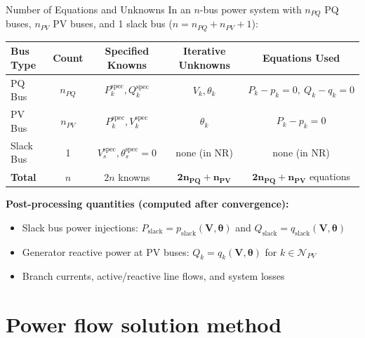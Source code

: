 \begin{frame}[allowframebreaks]{Number of Equations and Unknowns}
    In an $n$-bus power system with $n_{PQ}$ PQ buses, $n_{PV}$ PV buses, and 1 slack bus ($n = n_{PQ} + n_{PV} + 1$):
    
    \begin{table}[h]
        \centering
        \small
        \begin{tabular}{lcccc}
            \toprule
            \textbf{Bus Type} & \textbf{Count} & \textbf{Specified Knowns} & \textbf{Iterative Unknowns} & \textbf{Equations Used} \\
            \midrule
            PQ Bus    & $n_{PQ}$ & $P_k^{\text{spec}}, Q_k^{\text{spec}}$ & $V_k, \theta_k$ & $P_k - p_k = 0, \ Q_k - q_k = 0$ \\
            PV Bus    & $n_{PV}$ & $P_k^{\text{spec}}, V_k^{\text{spec}}$ & $\theta_k$      & $P_k - p_k = 0$ \\
            Slack Bus & 1        & $V_s^{\text{spec}}, \theta_s^{\text{spec}} = 0$ & none (in NR)    & none (in NR) \\
            \midrule
            \textbf{Total} & $n$ & $2n$ knowns & $\mathbf{2n_{PQ} + n_{PV}}$ & $\mathbf{2n_{PQ} + n_{PV}}$ equations \\
            \bottomrule
        \end{tabular}
    \end{table}

    \newpage
    \textbf{Post-processing quantities (computed after convergence):}
    \begin{itemize}
        \item Slack bus power injections: $P_{\text{slack}} = p_{\text{slack}}(\mathbf{V}, \boldsymbol{\theta})$ and $Q_{\text{slack}} = q_{\text{slack}}(\mathbf{V}, \boldsymbol{\theta})$
        \item Generator reactive power at PV buses: $Q_k = q_k(\mathbf{V}, \boldsymbol{\theta})$ for $k \in \mathcal{N}_{PV}$
        \item Branch currents, active/reactive line flows, and system losses
    \end{itemize}
\end{frame}

\section{Power flow solution method}

